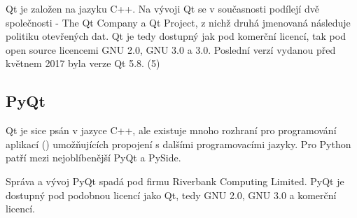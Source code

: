 Qt je založen na jazyku C++. Na vývoji Qt se v současnosti podílejí dvě společnosti - The Qt Company a Qt Project, z nichž druhá jmenovaná následuje politiku otevřených dat. Qt je tedy dostupný jak pod komerční licencí, tak pod open source licencemi GNU  2.0, GNU  3.0 a  3.0. Poslední verzí vydanou před květnem 2017 byla verze Qt 5.8. (5)


\subsection{PyQt}
Qt je sice psán v jazyce C++, ale existuje mnoho rozhraní pro programování aplikací () umožňujících propojení s dalšími programovacími jazyky. Pro Python patří mezi nejoblíbenější PyQt a PySide.

Správa a vývoj PyQt spadá pod firmu Riverbank Computing Limited. PyQt je dostupný pod podobnou licencí jako Qt, tedy GNU  2.0, GNU  3.0 a komerční licencí.



